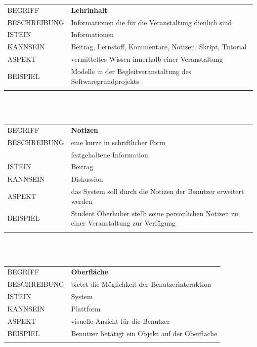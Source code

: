 \documentclass[12pt,a4paper]{article}
\begin{document}
\begin{tabular}{l p{12cm}}
BEGRIFF 	 & \textbf{Lehrinhalt} \\ 
BESCHREIBUNG & Informationen die für die Veranstaltung dienlich sind\\ 
ISTEIN   	 & Informationen\\
KANNSEIN 	 & Beitrag, Lernstoff, Kommentare, Notizen, Skript, Tutorial\\ 
ASPEKT   	 & vermitteltes Wissen innerhalb einer Veranstaltung\\
BEISPIEL 	 & Modelle in der Begleitveranstaltung des Softwaregrundprojekts\\\\
\hline
\end{tabular}\\\\  

\begin{tabular}{l p{12cm}}
BEGRIFF 	 & \textbf{Notizen} \\ 
BESCHREIBUNG & eine kurze in schriftlicher Form\\
			 & festgehaltene Information\\ 
ISTEIN   	 & Beitrag\\
KANNSEIN 	 & Diskussion\\ 
ASPEKT   	 & das System soll durch die Notizen der Benutzer erweitert werden\\
BEISPIEL 	 & Student Oberhuber stellt seine persönlichen Notizen zu einer Veranstaltung zur Verfügung\\\\
\hline
\end{tabular}\\\\  

\begin{tabular}{l p{12cm}}
BEGRIFF 	 & \textbf{Oberfläche} \\ 
BESCHREIBUNG & bietet die Möglichkeit der Benutzerinteraktion\\ 
ISTEIN   	 & System\\
KANNSEIN 	 & Plattform\\ 
ASPEKT   	 & visuelle Ansicht für die Benutzer\\
BEISPIEL 	 & Benutzer betätigt ein Objekt auf der Oberfläche\\\\
\hline
\end{tabular}\\\\  
\end{document}
